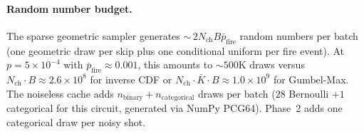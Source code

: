 \documentclass[a4paper,onecolumn,11pt,accepted=2026-06-10]{quantumarticle}
\begin{document}
\paragraph{Random number budget.}
The sparse geometric sampler generates ${\sim}\,2 N_{\mathrm{ch}} B \bar{p}_{\mathrm{fire}}$ random numbers per batch (one geometric draw per skip plus one conditional uniform per fire event). At $p = 5 \times 10^{-4}$ with $\bar{p}_{\mathrm{fire}} \approx 0.001$, this amounts to ${\sim}500\text{K}$ draws versus $N_{\mathrm{ch}} \cdot B \approx 2.6 \times 10^8$ for inverse CDF or $N_{\mathrm{ch}} \cdot \bar{K} \cdot B \approx 1.0 \times 10^9$ for Gumbel-Max. The noiseless cache adds $n_{\mathrm{binary}} + n_{\mathrm{categorical}}$ draws per batch ($28$ Bernoulli $+ 1$ categorical for this circuit, generated via NumPy PCG64). Phase~2 adds one categorical draw per noisy shot.
\end{document}
